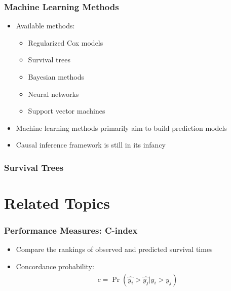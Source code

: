 \documentclass[14pt]{beamer}
\begin{document}
	\begin{frame}
	\frametitle{Machine Learning Methods}
	\begin{itemize}
	\item Available methods:
	\begin{itemize}
	\item Regularized Cox models
	\item Survival trees
	\item Bayesian methods
	\item Neural networks
	\item Support vector machines

	\end{itemize}
	\item Machine learning methods primarily aim to build prediction models
	\item Causal inference framework is still in its infancy

	\end{itemize}

	\end{frame}

	\begin{frame}
	\frametitle{Survival Trees}
	\end{frame}

	\section{Related Topics}

	\begin{frame}
	\frametitle{Performance Measures: C-index}
	\begin{itemize}
	\item Compare the rankings of observed and predicted survival times
	\item Concordance probability:
	\begin{eqnarray*}
	c = \Pr(\hat{y_i} > \hat{y_j} | y_i > y_j)
	\end{eqnarray*}

	\end{itemize}

	\end{frame}
\end{document}
